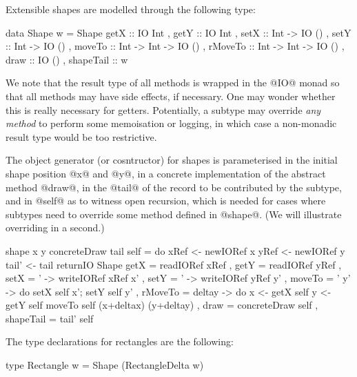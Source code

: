 \documentclass{jfp}
\begin{document}
Extensible shapes are modelled through the following type:

\begin{code}
 data Shape w =
      Shape { getX      :: IO Int
            , getY      :: IO Int
            , setX      :: Int -> IO ()
            , setY      :: Int -> IO ()
            , moveTo    :: Int -> Int -> IO ()
            , rMoveTo   :: Int -> Int -> IO ()
            , draw      :: IO ()
            , shapeTail :: w
            }
\end{code}

We note that the result type of all methods is wrapped in the @IO@
monad so that all methods may have side effects, if necessary.  One
may wonder whether this is really necessary for getters. Potentially,
a subtype may override \emph{any method} to perform some memoisation
or logging, in which case a non-monadic result type would be too
restrictive.

The object generator (or cosntructor) for shapes is parameterised in
the initial shape position @x@ and @y@, in a concrete implementation
of the abstract method @draw@, in the @tail@ of the record to be
contributed by the subtype, and in @self@ as to witness open
recursion, which is needed for cases where subtypes need to override
some method defined in @shape@. (We will illustrate overriding in a
second.)

\begin{code}
 shape x y concreteDraw tail self
   = do
        xRef  <- newIORef x
        yRef  <- newIORef y
        tail' <- tail
        returnIO Shape
                  { getX      = readIORef xRef
                  , getY      = readIORef yRef
                  , setX      = \x' -> writeIORef xRef x'
                  , setY      = \y' -> writeIORef yRef y'
                  , moveTo    = \x' y' -> do { setX self x'; setY self y' }
                  , rMoveTo   = \deltax deltay -> 
                                  do
                                     x <- getX self
                                     y <- getY self
                                     moveTo self (x+deltax) (y+deltay)
                  , draw      = concreteDraw self
                  , shapeTail = tail' self
                  }
\end{code}

The type declarations for rectangles are the following:

\begin{code}
 type Rectangle w = Shape (RectangleDelta w)
\end{code}
\end{document}
